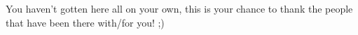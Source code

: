 \begin{acknowledgements}
    You haven't gotten here all on your own, this is your chance to thank the people that have been there with/for you! ;)
    
\bigskip

\rightline{\VarPhdName}


\end{acknowledgements}